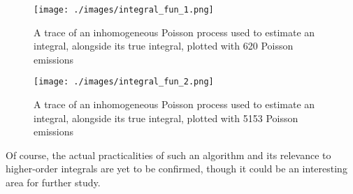\begin{figure}[h]
\texttt{[image: ./images/integral\_fun\_1.png]}
\caption{A trace of an inhomogeneous Poisson process used to estimate an integral, alongside its true integral, plotted with 620 Poisson emissions}
\label{integral_fun_1}
\end{figure}

\begin{figure}[h]
\texttt{[image: ./images/integral\_fun\_2.png]}
\caption{A trace of an inhomogeneous Poisson process used to estimate an integral, alongside its true integral, plotted with 5153 Poisson emissions}
\label{integral_fun_2}
\end{figure}

Of course, the actual practicalities of such an algorithm and its relevance to higher-order integrals are yet to be confirmed, though it could be an interesting area for further study.